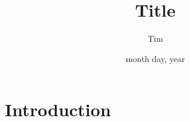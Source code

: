 \documentclass[11pt]{article}
\title{Title}
\author{Tim}
\date{month day, year}
\begin{document}
\maketitle

\section{Introduction}
\end{document}
